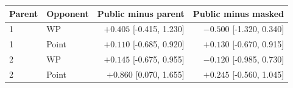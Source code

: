 \begin{tabular}{llrr}
\toprule
Parent & Opponent & Public minus parent & Public minus masked \\
\midrule
1 & WP & $+0.405$ [-0.415, 1.230] & $-0.500$ [-1.320, 0.340] \\
1 & Point & $+0.110$ [-0.685, 0.920] & $+0.130$ [-0.670, 0.915] \\
2 & WP & $+0.145$ [-0.675, 0.955] & $-0.120$ [-0.985, 0.730] \\
2 & Point & $+0.860$ [0.070, 1.655] & $+0.245$ [-0.560, 1.045] \\
\bottomrule
\end{tabular}

